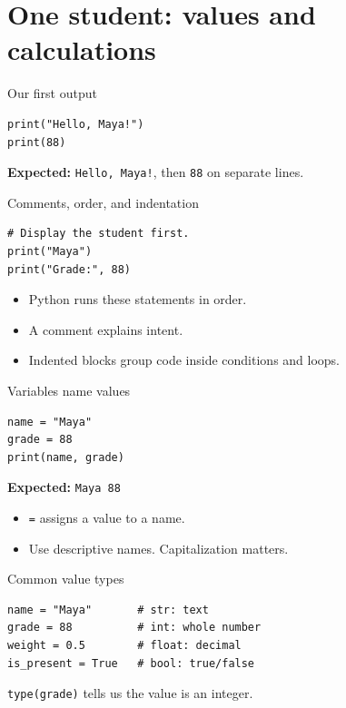 \documentclass[aspectratio=169,12pt]{beamer}
\begin{document}
\section{One student: values and calculations}
\begin{frame}[fragile]{Our first output}
\begin{lstlisting}
print("Hello, Maya!")
print(88)
\end{lstlisting}
\textbf{Expected:} \texttt{Hello, Maya!}, then \texttt{88} on separate lines.

\end{frame}
\begin{frame}[fragile]{Comments, order, and indentation}
\begin{lstlisting}
# Display the student first.
print("Maya")
print("Grade:", 88)
\end{lstlisting}
\begin{itemize}
\item Python runs these statements in order.
\item A comment explains intent.
\item Indented blocks group code inside conditions and loops.
\end{itemize}

\end{frame}
\begin{frame}[fragile]{Variables name values}
\begin{lstlisting}
name = "Maya"
grade = 88
print(name, grade)
\end{lstlisting}
\textbf{Expected:} \texttt{Maya 88}
\begin{itemize}
\item \texttt{=} assigns a value to a name.
\item Use descriptive names. Capitalization matters.
\end{itemize}

\end{frame}
\begin{frame}[fragile]{Common value types}
\begin{lstlisting}
name = "Maya"       # str: text
grade = 88          # int: whole number
weight = 0.5        # float: decimal
is_present = True   # bool: true/false
\end{lstlisting}
\texttt{type(grade)} tells us the value is an integer.
\end{frame}
\end{document}
